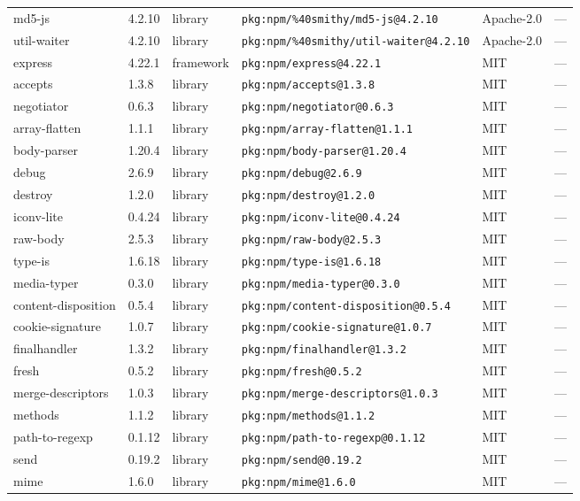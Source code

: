 \documentclass[11pt]{article}
\begin{document}
\begin{longtable}{|l|l|l|p{2.2cm}|l|p{4cm}|}
md5-js & 4.2.10 & library & \texttt{pkg:npm/\%40smithy/md5-js@4.2.10} & Apache-2.0 & — \\
util-waiter & 4.2.10 & library & \texttt{pkg:npm/\%40smithy/util-waiter@4.2.10} & Apache-2.0 & — \\
express & 4.22.1 & framework & \texttt{pkg:npm/express@4.22.1} & MIT & — \\
accepts & 1.3.8 & library & \texttt{pkg:npm/accepts@1.3.8} & MIT & — \\
negotiator & 0.6.3 & library & \texttt{pkg:npm/negotiator@0.6.3} & MIT & — \\
array-flatten & 1.1.1 & library & \texttt{pkg:npm/array-flatten@1.1.1} & MIT & — \\
body-parser & 1.20.4 & library & \texttt{pkg:npm/body-parser@1.20.4} & MIT & — \\
debug & 2.6.9 & library & \texttt{pkg:npm/debug@2.6.9} & MIT & — \\
destroy & 1.2.0 & library & \texttt{pkg:npm/destroy@1.2.0} & MIT & — \\
iconv-lite & 0.4.24 & library & \texttt{pkg:npm/iconv-lite@0.4.24} & MIT & — \\
raw-body & 2.5.3 & library & \texttt{pkg:npm/raw-body@2.5.3} & MIT & — \\
type-is & 1.6.18 & library & \texttt{pkg:npm/type-is@1.6.18} & MIT & — \\
media-typer & 0.3.0 & library & \texttt{pkg:npm/media-typer@0.3.0} & MIT & — \\
content-disposition & 0.5.4 & library & \texttt{pkg:npm/content-disposition@0.5.4} & MIT & — \\
cookie-signature & 1.0.7 & library & \texttt{pkg:npm/cookie-signature@1.0.7} & MIT & — \\
finalhandler & 1.3.2 & library & \texttt{pkg:npm/finalhandler@1.3.2} & MIT & — \\
fresh & 0.5.2 & library & \texttt{pkg:npm/fresh@0.5.2} & MIT & — \\
merge-descriptors & 1.0.3 & library & \texttt{pkg:npm/merge-descriptors@1.0.3} & MIT & — \\
methods & 1.1.2 & library & \texttt{pkg:npm/methods@1.1.2} & MIT & — \\
path-to-regexp & 0.1.12 & library & \texttt{pkg:npm/path-to-regexp@0.1.12} & MIT & — \\
send & 0.19.2 & library & \texttt{pkg:npm/send@0.19.2} & MIT & — \\
mime & 1.6.0 & library & \texttt{pkg:npm/mime@1.6.0} & MIT & — \\

\end{longtable}
\end{document}
